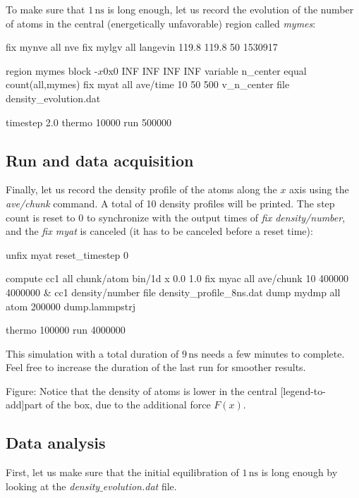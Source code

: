 \vspace{0.25cm} \noindent To make sure that $1\,\text{ns}$ is long enough, let us
record the evolution of the number of atoms in the central
(energetically unfavorable) region called \textit{mymes}:

\begin{lcverbatim}
fix mynve all nve
fix mylgv all langevin 119.8 119.8 50 1530917

region mymes block -${x0} ${x0} INF INF INF INF 
variable n_center equal count(all,mymes)
fix myat all ave/time 10 50 500 v_n_center file density_evolution.dat

timestep 2.0
thermo 10000
run 500000
\end{lcverbatim}

\subsection{Run and data acquisition}
Finally, let us record the density profile of the atoms
along the $x$ axis using the \textit{ave/chunk} command. A
total of 10 density profiles will be printed. The step count is
reset to 0 to synchronize with the output times of
\textit{fix density/number}, and the \textit{fix myat} is canceled (it has to be
canceled before a reset time):

\begin{lcverbatim}
unfix myat
reset_timestep 0

compute cc1 all chunk/atom bin/1d x 0.0 1.0
fix myac all ave/chunk 10 400000 4000000 &
    cc1 density/number file density_profile_8ns.dat
dump mydmp all atom 200000 dump.lammpstrj

thermo 100000
run 4000000
\end{lcverbatim}

\noindent This simulation with a total duration of $9\,\text{ns}$ needs a few
minutes to complete. Feel free to increase the 
duration of the last run for smoother results.

\vspace{0.25cm} Figure: Notice that the density of atoms is lower in the central
[legend-to-add]part of the box, due to the additional force $F (x)$.

\subsection{Data analysis}
\noindent First, let us make sure that the initial equilibration of $1\,\text{ns}$
is long enough by looking at the \textit{density$\_$evolution.dat} file.

